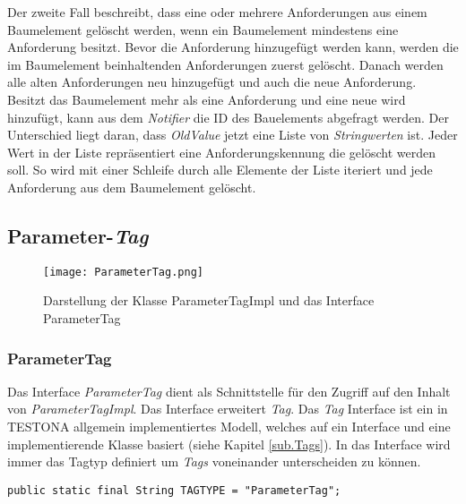 Der zweite Fall beschreibt, dass eine oder mehrere Anforderungen aus einem Baumelement gelöscht werden, wenn ein Baumelement mindestens eine Anforderung besitzt. Bevor die Anforderung hinzugefügt werden kann, werden die im Baumelement beinhaltenden Anforderungen zuerst gelöscht. Danach werden alle alten Anforderungen neu hinzugefügt und auch die neue Anforderung.\\


Besitzt das Baumelement mehr als eine Anforderung und eine neue wird hinzufügt, kann aus dem \textit{Notifier} die ID des Bauelements abgefragt werden. Der Unterschied liegt daran, dass \textit{OldValue} jetzt eine Liste von \textit{Stringwerten} ist. Jeder Wert in der Liste repräsentiert eine Anforderungskennung die gelöscht werden soll. So wird mit einer Schleife durch alle Elemente der Liste iteriert und jede Anforderung aus dem Baumelement gelöscht.\\



\subsection{Parameter-\textit{Tag}}\label{sub.ParameterTag}


\begin{figure}[h!]
  \begin{center}
    \texttt{[image: ParameterTag.png]}
  		  \caption{Darstellung der Klasse ParameterTagImpl und das Interface ParameterTag}
     \label{uml.ParameterTag}
  \end{center}
\end{figure}






\subsubsection{ParameterTag}
Das Interface \textit{ParameterTag} dient als Schnittstelle für den Zugriff auf den Inhalt von \textit{ParameterTagImpl}. Das Interface erweitert \textit{Tag}. Das \textit{Tag} Interface ist ein in TESTONA allgemein implementiertes Modell, welches auf ein Interface und eine implementierende Klasse basiert (siehe Kapitel \ref{sub.Tags}). In das Interface wird immer das Tagtyp definiert um \textit{Tags} voneinander unterscheiden zu können.

\begin{lstlisting}
public static final String TAGTYPE = "ParameterTag";
\end{lstlisting}

